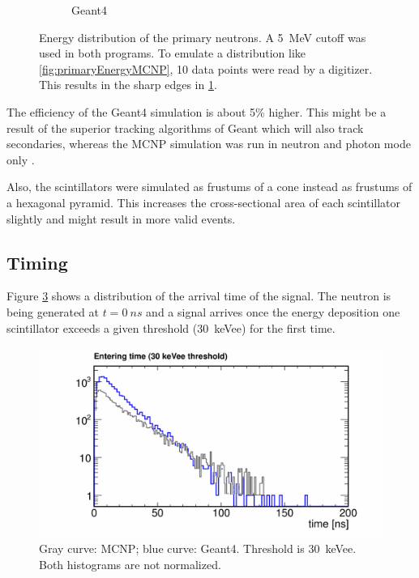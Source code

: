 \documentclass[12pt]{article}
\begin{document}
\begin{figure}[htbp]
\begin{subfigure}[t]{0.55\textwidth}
  		\caption{Geant4}
  		\label{fig:primaryEnergyGeant4}
  	\end{subfigure}
  	\caption{Energy distribution of the primary neutrons. A \SI{5}{MeV} cutoff was used in both programs. To emulate a distribution like  \ref{fig:primaryEnergyMCNP}, 10 data points were read by a digitizer. This results in the sharp edges in \ref{fig:primaryEnergyGeant4}.}
  	\label{fig_primaryEnergies}
  \end{figure}
  
 The efficiency of the Geant4 simulation is about 5\% higher. This might be a result of the superior tracking algorithms of Geant which will also track secondaries, whereas the MCNP simulation was run in neutron and photon mode only \cite[p.2]{MCNP}. 
 
 Also, the scintillators were simulated as frustums of a cone instead as frustums of a hexagonal pyramid. This increases the cross-sectional area of each scintillator slightly and might result in more valid events.   
 
\subsection{Timing}

Figure \ref{fig:timing30} shows a distribution of the arrival time of the signal. The neutron is being generated at $t=\SI{0}{ns}$ and a signal arrives once the energy deposition one scintillator exceeds a given threshold (\SI{30}{keVee}) for the first time.
 \begin{figure}[H]
 	     \includegraphics[trim = 0cm 0cm 0cm 1.1cm, clip, width=\textwidth]{pics/timing.pdf}
 	\caption{Gray curve: MCNP; blue curve: Geant4. Threshold is \SI{30}{keVee}. Both histograms are not normalized.}
 	\label{fig:timing30}
 \end{figure}
\end{document}
